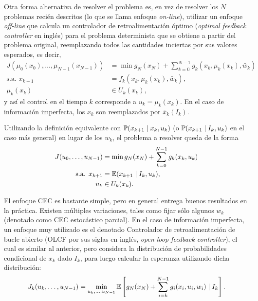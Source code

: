 Otra forma alternativa de resolver el problema es, en vez de resolver los \(N\) problemas recién descritos (lo que se llama enfoque \emph{on-line}), utilizar un enfoque \emph{off-line} que calcula un controlador de retroalimentación óptimo (\emph{optimal feedback controller} en inglés) para el problema determinista que se obtiene a partir del problema original, reemplazando todos las cantidades inciertas por sus valores esperados, es decir,
\begin{align*}
	J(\mu_{0}(x_{0}), \dotsc, \mu_{N-1}(x_{N-1}))	&= \min g_{N}(x_{N}) + \sum_{k=0}^{N-1} g_{k}(x_{k}, \mu_{k}(x_{k}), \bar{w}_{k}) \\
	\text{s.a. } x_{k+1}							&= f_{k}(x_{k}, \mu_{k}(x_{k}), \bar{w}_{k}), \\
	\mu_{k}(x_{k})									&\in U_{k}(x_{k}),
\end{align*}
y así el control en el tiempo \(k\) corresponde a \(u_{k} = \mu_{k}(x_{k})\). En el caso de información imperfecta, los \(x_{k}\) son reemplazados por \(\bar{x}_{k}(I_{k})\).

Utilizando la definición equivalente con \(\mathbb{P}(x_{k+1} \mid x_{k}, u_{k})\) (o \(\mathbb{P}(x_{k+1} \mid I_{k}, u_{k})\) en el caso más general) en lugar de los \(w_{k}\), el problema a resolver queda de la forma
\begin{align*}
	J(u_{0}, \dotsc, u_{N-1})		&= \min g_{N}(x_{N}) + \sum_{k=0}^{N-1} g_{k}(x_{k}, u_{k})\\
	\text{s.a. } x_{k+1}			&= \mathbb{E}(x_{k+1} \mid I_k, u_k), \\
	u_{k}							&\in U_{k}(x_{k}).
\end{align*}

El enfoque CEC es bastante simple, pero en general entrega buenos resultados en la práctica. Existen múltiples variaciones, tales como fijar sólo algunos \(w_{k}\) (denotado como CEC estocástico parcial). En el caso de información imperfecta, un enfoque muy utilizado es el denotado Controlador de retroalimentación de bucle abierto (OLCF por sus siglas en inglés, \emph{open-loop feedback controller}), el cual es similar al anterior, pero considera la distribución de probabilidades condicional de \(x_{k}\) dado \(I_{k}\), para luego calcular la esperanza utilizando dicha distribución:
\begin{equation*}
	J_{k}(u_{k}, \dotsc, u_{N-1}) = \min_{u_{k}, \dotsc, u_{N-1}} \mathbb{E}\left[g_{N}(x_{N}) + \sum_{i=k}^{N-1} g_{i}(x_{i},u_{i},w_{i}) \mid I_{k}\right].
\end{equation*}

